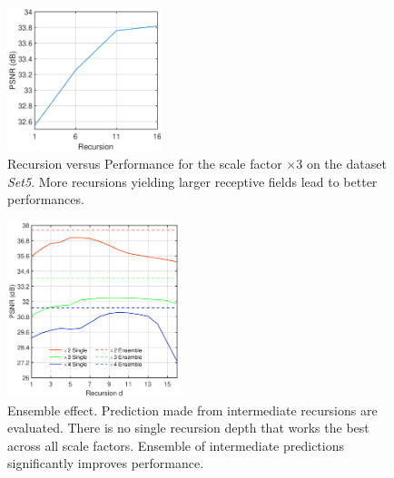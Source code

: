 \documentclass[10pt,twocolumn,letterpaper]{article}
\begin{document}
\begin{figure}
\begin{adjustwidth}{0cm}{-0.0cm}
\centering
{\graphicspath{{figs/graph1/}}\includegraphics[width=0.4\textwidth]{graphOne.pdf}}
\caption{Recursion versus Performance for the scale factor $\times$3 on the dataset \textit{Set5}. More recursions yielding larger receptive fields lead to better performances.}\end{adjustwidth}
\label{fig:more}
\end{figure}

\begin{figure}
\centering
{\graphicspath{{figs/graph1/}}\includegraphics[width=0.45\textwidth]{graphEnsemble}}
\caption{Ensemble effect. Prediction made from intermediate recursions are evaluated. There is no single recursion depth that works the best across all scale factors. Ensemble of intermediate predictions significantly improves performance. }
\label{fig:ensemble}
\end{figure}
\end{document}
